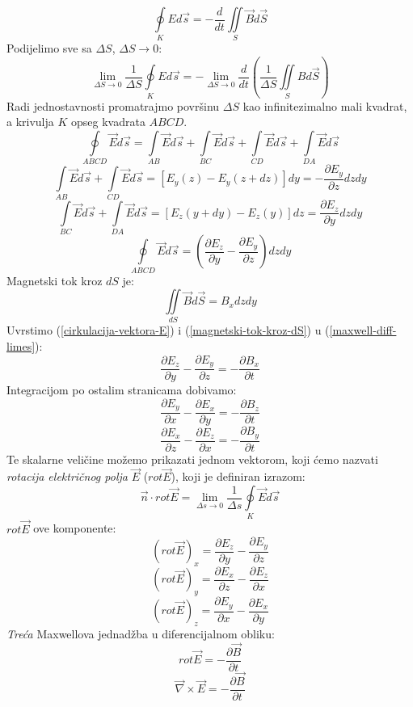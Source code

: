 \documentclass{report}
\begin{document}
$$\oint\limits_K {Ed\vec s} = - \frac{d}{dt} \iint \limits_S \vec{B} d \vec{S}$$
Podijelimo sve sa $\Delta S$, $\Delta S \to 0$:
\begin{equation}
	\mathop {\lim }\limits_{\Delta S \to 0} \frac{1}
	{{\Delta S}}\oint\limits_K {Ed\vec s}  =  - \mathop {\lim }\limits_{\Delta S \to 0} \frac{d}
	{{dt}}\left( {\frac{1}
	{{\Delta S}}\iint\limits_S {Bd\vec S}} \right)
	\label{maxwell-diff-limes}
\end{equation}
Radi jednostavnosti promatrajmo površinu $\Delta S$ kao infinitezimalno mali kvadrat, a krivulja $K$ opseg kvadrata $ABCD$.
$$\oint\limits_{ABCD} {\vec E d \vec s} = \int\limits_{AB} {\vec E d \vec s} + \int\limits_{BC} {\vec E d \vec s} + \int\limits_{CD} {\vec E d \vec s} + \int\limits_{DA} {\vec E d \vec s}$$
$$\int\limits_{AB} {\vec E d \vec s} + \int\limits_{CD} {\vec E d \vec s} = \left [ E_y(z) - E_y(z + dz) \right ] dy = - \frac{\partial E_y}{\partial z} dz dy$$
$$\int\limits_{BC} {\vec E d \vec s} + \int\limits_{DA} {\vec E d \vec s} = \left [ E_z(y + dy) - E_z(y) \right ] dz = \frac{\partial E_z}{\partial y} dz dy$$
\begin{equation}
	\oint \limits_{ABCD} {\vec E d \vec s} = \left ( \frac{\partial E_z}{\partial y} - \frac{\partial E_y}{\partial z} \right )dz dy
	\label{cirkulacija-vektora-E}
\end{equation}
Magnetski tok kroz $dS$ je:
\begin{equation}
	\iint \limits_{dS} {\vec B d \vec S} = B_x dz dy
	\label{magnetski-tok-kroz-dS}
\end{equation}
Uvrstimo (\ref{cirkulacija-vektora-E}) i (\ref{magnetski-tok-kroz-dS}) u (\ref{maxwell-diff-limes}):
$$\frac{\partial E_z}{\partial y} - \frac{\partial E_y}{\partial z} = - \frac{\partial B_x}{\partial t}$$
Integracijom po ostalim stranicama dobivamo:
$$\frac{\partial E_y}{\partial x} - \frac{\partial E_x}{\partial y} = - \frac{\partial B_z}{\partial t}$$
$$\frac{\partial E_x}{\partial z} - \frac{\partial E_z}{\partial x} = - \frac{\partial B_y}{\partial t}$$
Te skalarne veličine možemo prikazati jednom vektorom, koji ćemo nazvati \textit{rotacija električnog polja}
$\vec{E}$ ($rot \vec{E}$), koji je definiran izrazom:
$$\vec{n} \cdot rot \vec E = \mathop {\lim }\limits_{\Delta s \to 0} \frac{1} {{\Delta s}}\oint\limits_K {\vec Ed\vec s} $$
$rot \vec E$ ove komponente:
$$(rot \vec E)_x = \frac{\partial E_z}{\partial y} - \frac{\partial E_y}{\partial z}$$
$$(rot \vec E)_y = \frac{\partial E_x}{\partial z} - \frac{\partial E_z}{\partial x}$$
$$(rot \vec E)_z = \frac{\partial E_y}{\partial x} - \frac{\partial E_x}{\partial y}$$
\textit{Treća} Maxwellova jednadžba u diferencijalnom obliku:
\begin{equation}
	rot \vec E = - \frac{\partial \vec B}{\partial t}
	\label{treca-maxwellova-jed-u-diff-obliku}
\end{equation}
$$\vec \nabla \times \vec E = - \frac{\partial \vec B}{\partial t}$$
\end{document}
